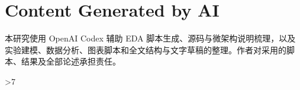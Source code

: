\documentclass[conference,10pt,letterpaper]{IEEEtran}
\title{\PaperTitle}
\author{\IEEEauthorblockN{Anonymous Submission}}
\newcounter{DACreferencepage}
\begin{document}
\maketitle















\section*{Content Generated by AI}
本研究使用 OpenAI Codex 辅助 EDA 脚本生成、源码与微架构说明梳理，以及实验建模、数据分析、图表脚本和全文结构与文字草稿的整理。作者对采用的脚本、结果及全部论述承担责任。



\clearpage
\setcounter{DACreferencepage}{\value{page}}
\ifnum\value{DACreferencepage}>7\relax
\fi
{}


\end{document}
